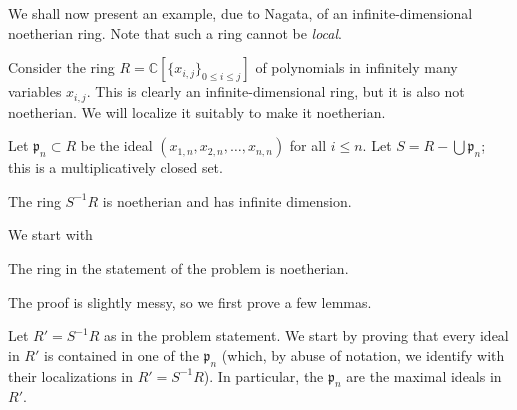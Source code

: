 We shall now present an example, due to Nagata, of an infinite-dimensional
noetherian ring. Note that such a ring cannot be \emph{local}.

Consider the ring $R=\mathbb{C}[\{x_{i,j}\}_{0 \leq i \leq j}]$ of polynomials in 
infinitely many variables $x_{i,j}$. 
This is clearly an infinite-dimensional ring, but it is also not noetherian.
We will localize it suitably to make it noetherian.

Let $\mathfrak{p}_n \subset R$ be the
ideal  $(x_{1,n}, x_{2,n}, \dots, x_{n,n})$ for all $i \leq n$.
Let $S = R - \bigcup \mathfrak{p}_n$; this is a multiplicatively closed set. 

\begin{theorem}[Nagata] The ring $S^{-1}R$ is noetherian and has infinite
dimension.
\end{theorem} 

We start with
\begin{proposition} 
The ring in the statement of the problem is noetherian.
\end{proposition} 

The proof is slightly messy, so we first prove a few lemmas.

Let $R' = S^{-1}R$ as in the problem statement. We start by proving that every ideal in $R'$ is contained
in one of the $\mathfrak{p}_n$ (which, by abuse of notation, we identify with
their localizations in $R' = S^{-1}R$). 
In particular, the $\mathfrak{p}_n$ are the maximal ideals in $R'$.


